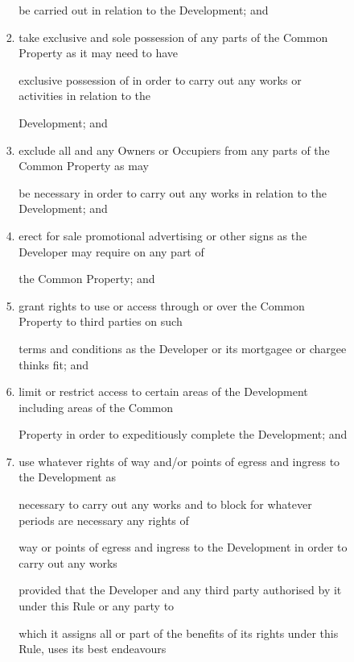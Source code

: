 \documentclass{article}
\begin{document}
\begin{enumerate}[label=\arabic*.]
\begin{enumerate}[label=\arabic{enumi}.\arabic*.]
\begin{enumerate}[label=(\arabic*)]
\begin{enumerate}[label=(\alph*)]
{\fontsize{10.02}{1}be carried out in relation to the Development; and }

\item {\fontsize{9.962}{1} take exclusive and sole possession of any parts of the Common Property as it may need to have }

{\fontsize{10.02}{1}exclusive possession of in order to carry out any works or activities in relation to the }

\newpage

{\fontsize{10.02}{1}Development; and }

\item {\fontsize{9.962}{1} exclude all and any Owners or Occupiers from any parts of the Common Property as may }

{\fontsize{10.02}{1}be necessary in order to carry out any works in relation to the Development; and }

\item {\fontsize{9.962}{1} erect for sale promotional advertising or other signs as the Developer may require on any part of }

{\fontsize{10.02}{1}the Common Property; and }

\item {\fontsize{9.962}{1} grant rights to use or access through or over the Common Property to third parties on such }

{\fontsize{10.02}{1}terms and conditions as the Developer or its mortgagee or chargee thinks fit; and }

\item {\fontsize{9.962}{1} limit or restrict access to certain areas of the Development including areas of the Common }

{\fontsize{10.02}{1}Property in order to expeditiously complete the Development; and }

\item {\fontsize{9.962}{1} use whatever rights of way and/or points of egress and ingress to the Development as }

{\fontsize{10.02}{1}necessary to carry out any works and to block for whatever periods are necessary any rights of }

{\fontsize{10.02}{1}way or points of egress and ingress to the Development in order to carry out any works }

{\fontsize{10.02}{1}provided that the Developer and any third party authorised by it under this Rule or any party to }

{\fontsize{10.02}{1}which it assigns all or part of the benefits of its rights under this Rule, uses its best endeavours }


\end{enumerate}
\end{enumerate}
\end{enumerate}
\end{enumerate}
\end{document}
